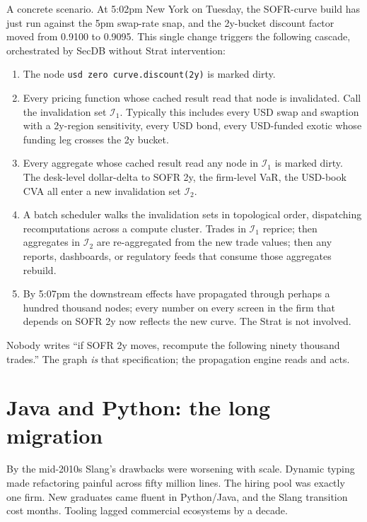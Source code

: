 A concrete scenario.  At 5:02pm New York on Tuesday, the
SOFR-curve build has just run against the 5pm swap-rate snap, and
the 2y-bucket discount factor moved from 0.9100 to 0.9095.  This
single change triggers the following cascade, orchestrated by
SecDB without Strat intervention:
\begin{enumerate}
  \item The node \texttt{usd zero curve.discount(2y)} is marked
    dirty.
  \item Every pricing function whose cached result read that node
    is invalidated.  Call the invalidation set $\mathcal{I}_1$.
    Typically this includes every USD swap and swaption with a
    2y-region sensitivity, every USD bond, every USD-funded exotic
    whose funding leg crosses the 2y bucket.
  \item Every aggregate whose cached result read any node in
    $\mathcal{I}_1$ is marked dirty.  The desk-level dollar-delta
    to SOFR 2y, the firm-level VaR, the USD-book CVA all enter a
    new invalidation set $\mathcal{I}_2$.
  \item A batch scheduler walks the invalidation sets in
    topological order, dispatching recomputations across a
    compute cluster.  Trades in $\mathcal{I}_1$ reprice; then
    aggregates in $\mathcal{I}_2$ are re-aggregated from the new
    trade values; then any reports, dashboards, or regulatory feeds
    that consume those aggregates rebuild.
  \item By 5:07pm the downstream effects have propagated through
    perhaps a hundred thousand nodes; every number on every screen
    in the firm that depends on SOFR 2y now reflects the new
    curve.  The Strat is not involved.
\end{enumerate}
Nobody writes ``if SOFR 2y moves, recompute the following ninety
thousand trades.''  The graph \emph{is} that specification; the
propagation engine reads and acts.


\section{Java and Python: the long migration}
\label{sec:migration}

By the mid-2010s Slang's drawbacks were worsening with scale.
Dynamic typing made refactoring painful across fifty million
lines.  The hiring pool was exactly one firm.  New graduates came
fluent in Python/Java, and the Slang transition cost months.
Tooling lagged commercial ecosystems by a decade.

